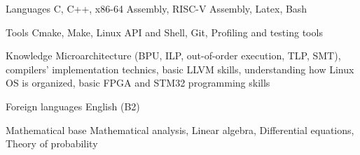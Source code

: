
\begin{cvskills}

  \cvskill
    {Languages} %
    {C, C++, x86-64 Assembly, RISC-V Assembly, Latex, Bash} %

  \cvskill
    {Tools} %
    {Cmake, Make, Linux API and Shell, Git, Profiling and testing tools} %

  \cvskill
    {Knowledge} %
    {Microarchitecture (BPU, ILP, out-of-order execution, TLP, SMT), compilers' implementation technics, basic LLVM skills, understanding how Linux OS is organized, basic FPGA and STM32 programming skills} %

  \cvskill
    {Foreign languages} %
    {English (B2)} %

  \cvskill
    {Mathematical base} %
    {Mathematical analysis, Linear algebra, Differential equations, Theory of probability} %

\end{cvskills}
